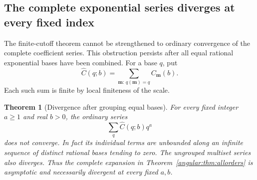 \documentclass[11pt,a4paper]{article}
\newtheorem{theorem}{Theorem}[section]
\theoremstyle{definition}
\theoremstyle{remark}
\numberwithin{equation}{section}
\begin{document}
\subsection{The complete exponential series diverges at every fixed index}
\label{angular:sec:divergence}

The finite-cutoff theorem cannot be strengthened to ordinary convergence
of the complete coefficient series. This obstruction persists after
all equal rational exponential bases have been combined.
For a base $q$, put
\[
 \widehat C(q;b)=\sum_{\mathbf m:\,q(\mathbf m)=q}C_{\mathbf m}(b).
\]
Each such sum is finite by local finiteness of the scale.

\begin{theorem}[Divergence after grouping equal bases]
\label{angular:thm:divergence}
For every fixed integer $a\ge1$ and real $b>0$, the ordinary series
\[
 \sum_q\widehat C(q;b)q^a
\]
does not converge. In fact its individual terms are unbounded along
an infinite sequence of distinct rational bases tending to zero.
The ungrouped multiset series also diverges. Thus the complete
expansion in Theorem~\ref{angular:thm:allorders} is asymptotic and
necessarily divergent at every fixed $a,b$.
\end{theorem}
\end{document}
